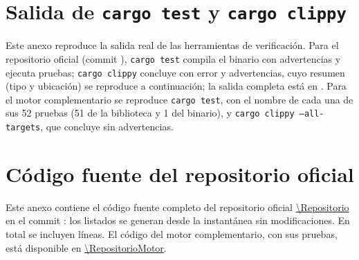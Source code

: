 \appendix
\renewcommand{\chaptername}{Anexo}

\chapter{Salida de \texttt{cargo test} y \texttt{cargo clippy}}\label{anx:tests}
Este anexo reproduce la salida real de las herramientas de verificación. Para el repositorio oficial (commit \texttt{\OfCommit}), \texttt{cargo test} compila el binario con \OfWarnBuild{} advertencias y ejecuta \OfPruebas{} pruebas; \texttt{cargo clippy} concluye con \OfClippyErr{} error y \OfClippyWarn{} advertencias, cuyo resumen (tipo y ubicación) se reproduce a continuación; la salida completa está en . Para el motor complementario se reproduce \texttt{cargo test}, con el nombre de cada una de sus 52 pruebas (51 de la biblioteca y 1 del binario), y \texttt{cargo clippy --all-targets}, que concluye sin advertencias.

{\singlespacing




}

\chapter{Código fuente del repositorio oficial}\label{anx:codigo}
Este anexo contiene el código fuente completo del repositorio oficial \url{\Repositorio} en el commit \texttt{\OfCommit}: los listados se generan desde la instantánea  sin modificaciones. En total se incluyen \LineasFuente{} líneas. El código del motor complementario, con sus pruebas, está disponible en \url{\RepositorioMotor}.

